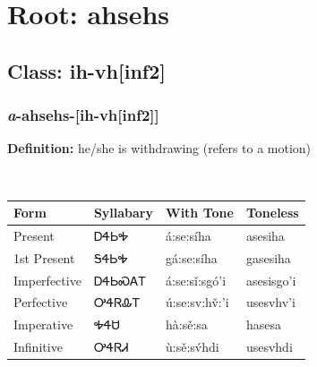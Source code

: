 \needspace{4in}
\section*{Root: ahsehs}
\nopagebreak
{}
\needspace{3in}
\subsection*{Class: ih-vh[inf2]}
\nopagebreak
\needspace{2in}
\subsubsection*{\textit{a}{-}\textbf{ahsehs}{-}[ih-vh[inf2]]}
\nopagebreak
\textbf{Definition: } he/she is withdrawing (refers to a motion)
\\[0.5em]
\begin{tabularx}{\textwidth}{l X X X}%
\toprule%
\textbf{Form}&\textbf{Syllabary}&\textbf{With Tone}&\textbf{Toneless}\\%
\midrule%
Present&ᎠᏎᏏᎭ&á:se:síha&asesiha\\%
1st Present&ᎦᏎᏏᎭ&gá:se:síha&gasesiha\\%
Imperfective&ᎠᏎᏏᏍᎪᎢ&á:se:sǐ:sgó’i&asesisgo’i\\%
Perfective&ᎤᏎᏒᎲᎢ&ú:se:sv:hv̌:’i&usesvhv’i\\%
Imperative&ᎭᏎᏌ&hà:sě:sa&hasesa\\%
Infinitive&ᎤᏎᏒᏗ&ù:sě:sv́hdi&usesvhdi\\%
\bottomrule%
\end{tabularx}
\\[1em]